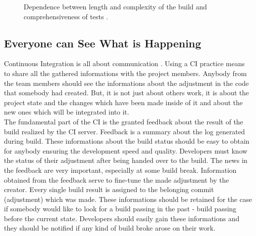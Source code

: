 \begin{figure}[H]
    \centering
    \caption{Dependence between length and complexity of the build and comprehensiveness of tests \cite{deployment_automation}.}
    \label{fig:grap_dependence}
\end{figure}

\subsection{Everyone can See What is Happening}

Continuous Integration is all about communication \cite{MartinFowler}. Using a CI practice means to share all the gathered informations with the project members. Anybody from the team members should see the informations about the adjustment in the code that somebody had created. But, it is not just about others work, it is about the project state and the changes which have been made inside of it and about the new ones which will be integrated into it.\\

The fundamental part of the CI is the granted feedback about the result of the build realized by the CI server. Feedback is a summary about the log generated 
during build. These informations about the build status should be easy to obtain for anybody ensuring the development speed and quality. Developers must know the status of their adjustment after being handed over to the build. The news in the feedback are very important, especially at some build break. Information obtained from the feedback serve to fine-tune the made adjustment by the creator. Every single build result is assigned to the belonging commit (adjustment) which was made. These informations should be retained for the case if somebody would like to look for a build passing in the past - build passing before the current state. Developers should easily gain these informations and they should be notified if any kind of build broke arose on their work.

